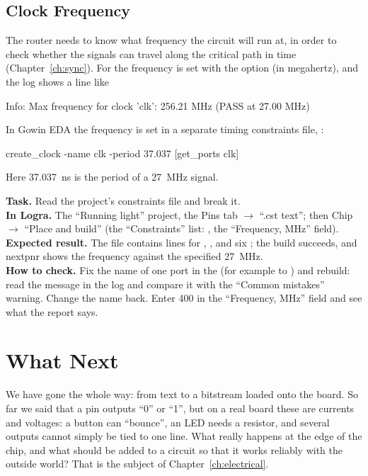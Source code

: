 \subsection{Clock Frequency}

The router needs to know what frequency the circuit will run at, in order to
check whether the signals can travel along the critical path in time
(Chapter~\ref{ch:sync}). For  the frequency is set with the option
 (in megahertz), and the log shows a line like
\begin{vcode}[text]
Info: Max frequency for clock 'clk': 256.21 MHz (PASS at 27.00 MHz)
\end{vcode}
In Gowin EDA the frequency is set in a separate timing constraints file, :
\begin{vcode}[text]
create_clock -name clk -period 37.037 [get_ports {clk}]
\end{vcode}
Here 37.037~ns is the period of a 27~MHz signal.

\begin{diybox}
\textbf{Task.} Read the project's constraints file and break it.\\
\textbf{In Logra.} The ``Running light'' project, the Pins tab $\to$ ``.cst text''; then Chip $\to$ ``Place and build'' (the ``Constraints'' list: , the ``Frequency, MHz'' field).\\
\textbf{Expected result.} The file contains  lines for , , and six ; the build succeeds, and nextpnr shows the frequency against the specified 27~MHz.\\
\textbf{How to check.}  Fix the name of one port in the  (for example  to ) and rebuild: read the message in the log and compare it with the ``Common mistakes'' warning. Change the name back.  Enter 400 in the ``Frequency, MHz'' field and see what the report says.
\end{diybox}

\section{What Next}

We have gone the whole way: from text to a bitstream loaded onto the board. So
far we said that a pin outputs ``0'' or ``1'', but on a real board these are
currents and voltages: a button can ``bounce'', an LED needs a resistor, and
several outputs cannot simply be tied to one line. What really happens at the
edge of the chip, and what should be added to a circuit so that it works
reliably with the outside world? That is the subject of Chapter~\ref{ch:electrical}.
